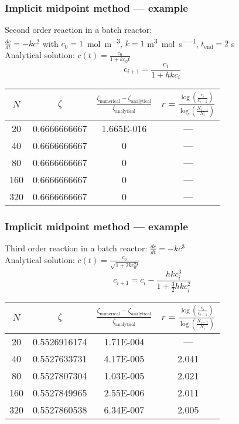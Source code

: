 \begin{frame}
  \frametitle{Implicit midpoint method --- example}
  {\color{tuealert}Second order} reaction in a batch reactor:\\
  $\frac{dc}{dt} = -kc^2$ with $c_0 = 1$~\si{\mole\per\cubic\meter}, $k = 1$ \si{\cubic\meter\per\mole\per\second}, $t_\text{end} = 2$ \si{\second}\\
  Analytical solution: $c(t) = \frac{c_0}{1+kc_0t}$
  \[
    c_{i+1} = \frac{c_i}{1+hkc_i}
  \]
  \pause  
  \begin{longtable}{cccc}
    \hline
    $N$ & $\zeta$ & $\frac{\zeta^{}_\text{numerical}-\zeta_\text{analytical}}{\zeta_\text{analytical}}$ & $ r = \frac{\log\left(\frac{\epsilon_i}{\epsilon_{i-1}}\right)}{\log \left( \frac{N_{i-1}}{N_i}\right)} $ \\ \hline
    20  & 0.6666666667 & \num{1.665E-016} & ---\\
    40  & 0.6666666667 & \num{0} & ---\\
    80  & 0.6666666667 & \num{0} & ---\\
    160 & 0.6666666667 & \num{0} & ---\\
    320 & 0.6666666667 & \num{0} & ---\\
    \hline
  \end{longtable}
\end{frame}

\begin{frame}
  \frametitle{Implicit midpoint method --- example}
  {\color{tuealert}Third order} reaction in a batch reactor: $\frac{dc}{dt} = -kc^3$\\
  Analytical solution: $c(t) = \frac{c_0}{\sqrt{1+2kc_0^2t}}$
  \[
    c_{i+1} = c_i - \frac{hkc_i^3}{1+\frac{3}{2}hkc_i^2}
  \]
  \pause  
  \begin{longtable}{cccc}
    \hline
    $N$ & $\zeta$ & $\frac{\zeta^{}_\text{numerical}-\zeta_\text{analytical}}{\zeta_\text{analytical}}$ & $ r = \frac{\log\left(\frac{\epsilon_i}{\epsilon_{i-1}}\right)}{\log \left( \frac{N_{i-1}}{N_i}\right)} $ \\ \hline
    20  & 0.5526916174 & \num{1.71E-004} & ---\\
    40  & 0.5527633731 & \num{4.17E-005} & 2.041\\
    80  & 0.5527807304 & \num{1.03E-005} & 2.021\\
    160 & 0.5527849965 & \num{2.55E-006} & 2.011\\
    320 & 0.5527860538 & \num{6.34E-007} & 2.005\\
    \hline
  \end{longtable}
\end{frame}


